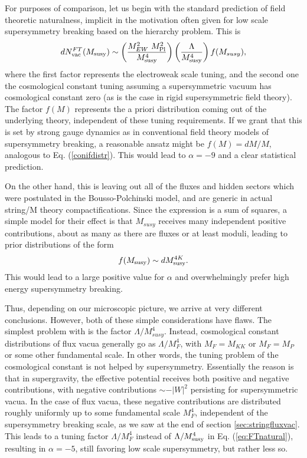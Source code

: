 \documentclass[aps,amsfonts]{ar2e}
\begin{document}
For purposes of comparison, let us begin with the standard
prediction of field theoretic naturalness, implicit in the
motivation often given for low scale supersymmetry breaking based on
the hierarchy problem. This is
\begin{equation}\label{eq:FTnatural}
dN_{\rm vac}^{FT}(M_{\rm susy})
 \sim
\left( \frac{M_{EW}^2~M_{\rm Pl}^2}{M_{\rm susy}^4} \right) \left(
\frac{\Lambda}{M_{\rm susy}^4} \right) f(M_{susy}),
\end{equation}
where the first factor represents the electroweak scale tuning, and
the second one the cosmological constant tuning assuming a
supersymmetric vacuum has cosmological constant zero (as is the case
in rigid supersymmetric field theory). The factor $f(M)$ represents
the a priori distribution coming out of the underlying theory,
independent of these tuning requirements. If we grant that this is
set by strong gauge dynamics as in conventional field theory models
of supersymmetry breaking, a reasonable ansatz might be $f(M)=dM/M$,
analogous to Eq. (\ref{conifdistr}). This would lead to $\alpha=-9$ and
a clear statistical prediction.

On the other hand, this is leaving out all of the fluxes and
hidden sectors which were postulated in the Bousso-Polchinski model,
and are generic in actual string/M theory compactifications.
Since the expression  is a sum
of squares, a simple model for their effect is that $M_{susy}$
receives many independent positive contributions,
about as many as there are fluxes or at least moduli,
leading to prior distributions of the form
\cite{Douglas:2004qg,Susskind:2004uv}
\begin{equation} \label{eq:highsusy}
 f(M_{\rm susy}) \sim d M_{\rm susy}^{4K} .
\end{equation}
This would lead to a large positive value for $\alpha$ and
overwhelmingly prefer high energy supersymmetry breaking.

Thus, depending on our microscopic picture, we arrive at very different
conclusions. However, both of these simple considerations have flaws.
The simplest problem with  is the factor
$\Lambda/M_{susy}^4$.  Instead, cosmological constant distributions
of flux vacua generally go as $\Lambda/M_F^4$, with $M_F = M_{KK}$
or $M_F=M_P$ or some other fundamental scale. In other words, the
tuning problem of the cosmological constant is not helped by
supersymmetry. Essentially the reason is that in supergravity, the
effective potential receives both positive and negative
contributions, with negative contributions $\sim -|W|^2$ persisting
for supersymmetric vacua.  In the case of flux vacua, these negative
contributions are distributed
roughly uniformly up to some fundamental scale $M_F^4$, independent
of the supersymmetry breaking scale, as we saw at the end of section
\ref{sec:stringfluxvac}. This leads to a tuning factor
$\Lambda/M_F^4$ instead of $\Lambda/M_{\rm susy}^4$ in
Eq. (\ref{eq:FTnatural}), resulting in $\alpha=-5$, still favoring low
scale supersymmetry, but rather less so.
\end{document}

